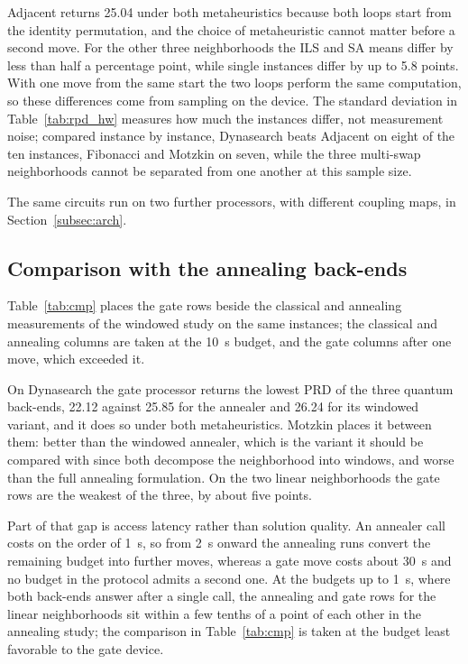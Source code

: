 \documentclass{svproc}
\newcommand{\rev}[1]{{\color{blue}#1}}
\newcommand{\rev}[1]{#1}
\begin{document}
Adjacent returns 25.04 under both metaheuristics because both loops start from
the identity permutation, and the choice of metaheuristic cannot matter before a
second move. \rev{For the other three neighborhoods the ILS and SA means differ
by less than half a percentage point, while single instances differ by up to
5.8 points. With one move from the same start the two loops perform the same
computation, so these differences come from sampling on the device. The
standard deviation in Table~\ref{tab:rpd_hw} measures how much the instances
differ, not measurement noise; compared instance by instance, Dynasearch beats
Adjacent on eight of the ten instances, Fibonacci and Motzkin on seven, while
the three multi-swap neighborhoods cannot be separated from one another at this
sample size.}

The same circuits run on two further processors, with different coupling maps,
in Section~\ref{subsec:arch}.

\subsection{Comparison with the annealing back-ends}
\label{subsec:cmp}
Table~\ref{tab:cmp} places the gate rows beside the classical and annealing
measurements of the windowed study on the same instances\rev{; the classical and
annealing columns are taken at the 10~s budget, and the gate columns after one
move, which exceeded it}.

On Dynasearch the gate processor returns the lowest PRD of the three quantum
back-ends, 22.12 against 25.85 for the annealer and 26.24 for its windowed
variant, and it does so under both metaheuristics. Motzkin places it between
them: better than the windowed annealer, which is the variant it should be
compared with since both decompose the neighborhood into windows, and worse than
the full annealing formulation. On the two linear neighborhoods the gate rows
are the weakest of the three, by about five points.

Part of that gap is access latency rather than solution quality. An annealer
call costs on the order of \rev{1~s}, so from \rev{2~s} onward the annealing
runs convert the remaining budget into further moves, whereas a gate move costs
about \rev{30~s} and no budget in the protocol admits a second one. At the
budgets up to \rev{1~s}, where both back-ends answer after a single call, the
annealing and gate rows for the linear neighborhoods sit within a few tenths of
a point of each other \rev{in the annealing study}; the comparison in
Table~\ref{tab:cmp} is taken at the budget least favorable to the gate device.
\end{document}
